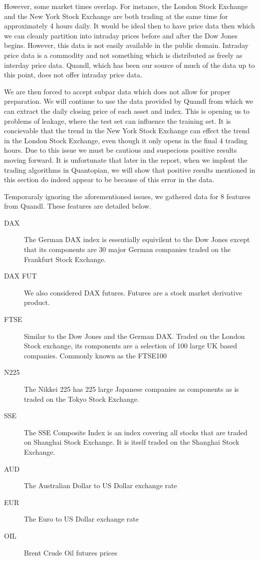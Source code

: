 \documentclass{report}
\begin{document}
However, some market times overlap. For instance, the London Stock Exchange and the New York Stock Exchange are both trading at the same time for approximately 4 hours daily. It would be ideal then to have price data then which we can cleanly partition into intraday prices before and after the Dow Jones begins. However, this data is not easily available in the public domain. Intraday price data is a commodity and not something which is distributed as freely as interday price data. Quandl, which has been our source of much of the data up to this point, does not offer intraday price data.

We are then forced to accept subpar data which does not allow for proper preparation. We will continue to use the data provided by Quandl from which we can extract the daily closing price of each asset and index. This is opening us to problems of leakage, where the test set can influence the training set. It is concievable that the trend in the New York Stock Exchange can effect the trend in the London Stock Exchange, even though it only opens in the final 4 trading hours. Due to this issue we must be cautious and suspecious positive results moving forward. It is unfortunate that later in the report, when we implent the trading algorithms in Quantopian, we will show that positive results mentioned in this section do indeed appear to be because of this error in the data.

Temporaraly ignoring the aforementioned issues, we gathered data for 8 features from Quandl. These features are detailed below.

\begin{description}
  \item[DAX] The German DAX index is essentially equivilent to the Dow Jones except that its components are 30 major German companies traded on the Frankfurt Stock Exchange.
  
  \item[DAX FUT] We also considered DAX futures. Futures are a stock market derivative product.
  
  \item[FTSE] Similar to the Dow Jones and the German DAX. Traded on the London Stock exchange, its components are a selection of 100 large UK based companies. Commonly known as the FTSE100
  
  \item[N225] The Nikkei 225 has 225 large Japanese companies as components as is traded on the Tokyo Stock Exchange.
  
  \item[SSE] The SSE Composite Index is an index covering all stocks that are traded on Shanghai Stock Exchange. It is itself traded on the Shanghai Stock Exchange.
  
  \item[AUD] The Australian Dollar to US Dollar exchange rate
  
  \item[EUR] The Euro to US Dollar exchange rate
  
  \item[OIL] Brent Crude Oil futures prices
      
\end{description}
\end{document}

